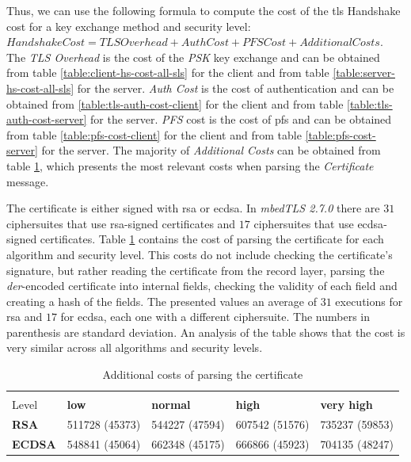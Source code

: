 Thus, we can use the following formula to compute the cost of the \gls{tls} Handshake cost for a key exchange method and
security level: $Handshake Cost = TLS Overhead + Auth Cost + PFS Cost + Additional Costs$. The \textit{TLS Overhead} is the cost of the
\textit{PSK} key exchange and can be obtained from table \ref{table:client-hs-cost-all-sls} for the client
and from table \ref{table:server-hs-cost-all-sls} for the server. \textit{Auth Cost} is the cost of authentication and can be obtained
from \ref{table:tls-auth-cost-client} for the client and from table \ref{table:tls-auth-cost-server} for the server. \textit{PFS} cost
is the cost of \gls{pfs} and can be obtained from table \ref{table:pfs-cost-client} for the client and from table \ref{table:pfs-cost-server}
for the server. The majority of \textit{Additional Costs} can be obtained from table \ref{table:cert-parse-cost}, which presents the most relevant
costs when parsing the \textit{Certificate} message.

The certificate is either signed with
\gls{rsa} or \gls{ecdsa}. In \textit{mbedTLS 2.7.0} there are $31$ ciphersuites that use \gls{rsa}-signed certificates and $17$ ciphersuites
that use \gls{ecdsa}-signed certificates. Table \ref{table:cert-parse-cost} contains the cost of parsing the certificate for each algorithm
and security level. This costs do not include checking the certificate's signature, but rather reading the certificate from the record layer,
parsing the \textit{der}-encoded certificate into internal fields, checking the validity of each field and creating a hash of the fields.
The presented values an average of $31$ executions for \gls{rsa} and $17$ for \gls{ecdsa}, each one with a
different ciphersuite. The numbers in parenthesis are standard deviation. An analysis of the table shows that the cost is very similar across all
algorithms and security levels.

\begin{table}[]
\begin{tabular}{|l|l|l|l|l|}
\hline
 \backslashbox{Algorithm}{Security\\Level}              & \textbf{low}   & \textbf{normal} & \textbf{high} & \textbf{very high} \\ \hline
\textbf{RSA}   & 511728 (45373) & 544227 (47594)  & 607542 (51576) & 735237 (59853)      \\ \hline
\textbf{ECDSA} & 548841 (45064) & 662348 (45175) & 666866 (45923)  & 704135 (48247)        \\ \hline
\end{tabular}
\centering \caption{ \label{table:cert-parse-cost} Additional costs of parsing the certificate}

\end{table}

